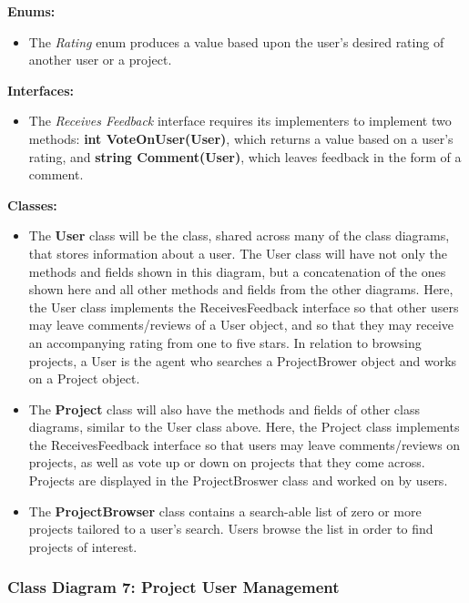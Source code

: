 \documentclass[twoside,letterpaper]{article}
\begin{document}
{\textbf{Enums:}\\
\begin{itemize}
	\item The \textit{Rating} enum produces a value based upon the user's desired rating of another user or a project.
\end{itemize}
\textbf{Interfaces:}\\
\begin{itemize}
	\item The \textit{Receives Feedback} interface requires its implementers to implement two methods: \textbf{int VoteOnUser(User)}, which returns a value based on a user's rating, and \textbf{string Comment(User)}, which leaves feedback in the form of a comment.
\end{itemize}
\textbf{Classes:}
\begin{itemize}
	\item The \textbf{User} class will be the class, shared across many of the class diagrams, that stores information about a user. The User class will have not only the methods and fields shown in this diagram, but a concatenation of the ones shown here and all other methods and fields from the other diagrams. Here, the User class implements the ReceivesFeedback interface so that other users may leave comments/reviews of a User object, and so that they may receive an accompanying rating from one to five stars. In relation to browsing projects, a User is the agent who searches a ProjectBrower object and works on a Project object.
	\item The \textbf{Project} class will also have the methods and fields of other class diagrams, similar to the User class above. Here, the Project class implements the ReceivesFeedback interface so that users may leave comments/reviews on projects, as well as vote up or down on projects that they come across. Projects are displayed in the ProjectBroswer class and worked on by users.
	\item The \textbf{ProjectBrowser} class contains a search-able list of zero or more projects tailored to a user's search. Users browse the list in order to find projects of interest.
\end{itemize}

\newpage
\subsubsection[Class Diagram 7: Project User Management]{\rmfamily\bfseries\color{black}
	Class Diagram 7: Project User Management}
\hypertarget{RefHeading22059017292}{}
\bigskip

}
\end{document}
